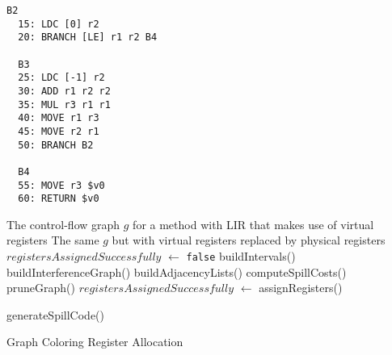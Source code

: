 \documentclass[8pt,a4paper,compress]{beamer}
\begin{document}
\begin{frame}[fragile]
\pause

\begin{lstlisting}[language={}]
  B2
  15: LDC [0] r2
  20: BRANCH [LE] r1 r2 B4

  B3
  25: LDC [-1] r2
  30: ADD r1 r2 r2
  35: MUL r3 r1 r1
  40: MOVE r1 r3
  45: MOVE r2 r1
  50: BRANCH B2

  B4
  55: MOVE r3 $v0                                                               
  60: RETURN $v0
\end{lstlisting}
\end{frame}

\begin{frame}[fragile]
\pause

\begin{algorithm}[H]
\begin{algorithmic}
\REQUIRE The control-flow graph $g$ for a method with LIR that makes use of virtual registers
\ENSURE The same $g$ but with virtual registers replaced by physical registers
\STATE $registersAssignedSuccessfully$ $\gets$ \lstinline{false}
\REPEAT
    \REPEAT
        \STATE buildIntervals()
        \STATE buildInterferenceGraph()
        \STATE buildAdjacencyLists()
        \STATE computeSpillCosts()
	\STATE pruneGraph()
        \STATE $registersAssignedSuccessfully$ $\gets$ assignRegisters()

            \STATE generateSpillCode()
        \ENDIF
{}
\end{algorithmic}
\caption{Graph Coloring Register Allocation}
\end{algorithm}
\end{frame}
\end{document}
